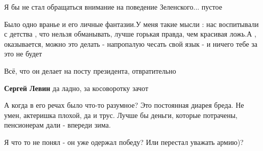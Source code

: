 \begin{itemize}
Я бы не стал обращаться внимание на поведение Зеленского... пустое

 

Было одно вранье и его личные фантазии.У меня такие мысли : нас воспитывали с
детства , что нельзя обманывать, лучше горькая правда, чем красивая ложь.А ,
оказывается, можно это делать - напропалую чесать свой язык - и ничего тебе за
это не будет


 
Всё, что он делает на посту президента, отвратительно

\begin{itemize}
 
\textbf{Сергей Левин} да ладно, за косоворотку зачот
\end{itemize}

 

А когда в его речах было что-то разумное? Это постоянная диарея бреда. Не умен,
актеришка плохой, да и трус. Лучше бы деньги, которые потрачены, пенсионерам
дали - впереди зима.


 
Я что то не понял - он уже одержал победу? Или перестал уважать армию)?

\begin{itemize}
 

\end{itemize}
\end{itemize}
